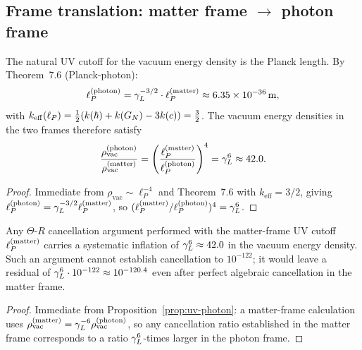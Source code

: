 \subsection{Frame translation: matter frame $\to$ photon frame}

\begin{proposition}
\label{prop:uv-photon}
The natural UV cutoff for the vacuum energy density is the Planck
length. By Theorem~7.6 (Planck-photon):
\[
  \ell_P^{(\mathrm{photon})} = \gamma_L^{-3/2}\cdot\ell_P^{(\mathrm{matter})}
  \approx 6.35\times10^{-36}\,\mathrm{m},
\]
with $k_{\mathrm{eff}}(\ell_P) = \tfrac{1}{2}(k(\hbar)+k(G_N)-3k(c))
= \tfrac{3}{2}$.
The vacuum energy densities in the two frames therefore satisfy
\begin{equation}\label{eq:rho-ratio}
  \frac{\rho_{\mathrm{vac}}^{(\mathrm{photon})}}
       {\rho_{\mathrm{vac}}^{(\mathrm{matter})}}
  = \left(\frac{\ell_P^{(\mathrm{matter})}}{\ell_P^{(\mathrm{photon})}}\right)^4
  = \gamma_L^{6} \approx 42.0.
\end{equation}
\end{proposition}

\begin{proof}
Immediate from $\rho_{\mathrm{vac}} \sim \ell_P^{-4}$ and
Theorem~7.6 with $k_{\mathrm{eff}} = 3/2$, giving
$\ell_P^{(\mathrm{photon})} = \gamma_L^{-3/2}\ell_P^{(\mathrm{matter})}$,
so $(\ell_P^{(\mathrm{matter})}/\ell_P^{(\mathrm{photon})})^4 = \gamma_L^6$.
\end{proof}

\begin{corollary}
\label{cor:matter-error}
Any $\Theta$-$R$ cancellation argument performed with the matter-frame
UV cutoff $\ell_P^{(\mathrm{matter})}$ carries a systematic inflation of
$\gamma_L^6 \approx 42.0$ in the vacuum energy density. Such an argument
cannot establish cancellation to $10^{-122}$; it would leave a residual
of $\gamma_L^6 \cdot 10^{-122} \approx 10^{-120.4}$ even after perfect
algebraic cancellation in the matter frame.
\end{corollary}

\begin{proof}
Immediate from Proposition~\ref{prop:uv-photon}: a matter-frame
calculation uses $\rho_{\mathrm{vac}}^{(\mathrm{matter})}
= \gamma_L^{-6}\rho_{\mathrm{vac}}^{(\mathrm{photon})}$, so any
cancellation ratio established in the matter frame corresponds to a
ratio $\gamma_L^6$-times larger in the photon frame.
\end{proof}

